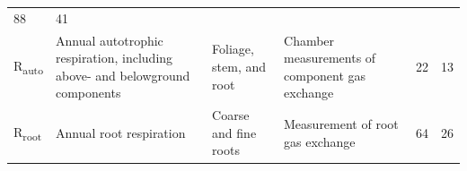 \documentclass[]{article}
\begin{document}
\begin{longtable}[]{@{}llllll@{}}
\begin{minipage}[t]{0.07\columnwidth}
88\strut
\end{minipage} & \begin{minipage}[t]{0.07\columnwidth}\raggedright\strut
41\strut
\end{minipage}\tabularnewline
\begin{minipage}[t]{0.14\columnwidth}\raggedright\strut
R\textsubscript{auto}\strut
\end{minipage} & \begin{minipage}[t]{0.19\columnwidth}\raggedright\strut
Annual autotrophic respiration, including above- and belowground
components\strut
\end{minipage} & \begin{minipage}[t]{0.13\columnwidth}\raggedright\strut
Foliage, stem, and root\strut
\end{minipage} & \begin{minipage}[t]{0.23\columnwidth}\raggedright\strut
Chamber measurements of component gas exchange\strut
\end{minipage} & \begin{minipage}[t]{0.07\columnwidth}\raggedright\strut
22\strut
\end{minipage} & \begin{minipage}[t]{0.07\columnwidth}\raggedright\strut
13\strut
\end{minipage}\tabularnewline
\begin{minipage}[t]{0.14\columnwidth}\raggedright\strut
R\textsubscript{root}\strut
\end{minipage} & \begin{minipage}[t]{0.19\columnwidth}\raggedright\strut
Annual root respiration\strut
\end{minipage} & \begin{minipage}[t]{0.13\columnwidth}\raggedright\strut
Coarse and fine roots\strut
\end{minipage} & \begin{minipage}[t]{0.23\columnwidth}\raggedright\strut
Measurement of root gas exchange\strut
\end{minipage} & \begin{minipage}[t]{0.07\columnwidth}\raggedright\strut
64\strut
\end{minipage} & \begin{minipage}[t]{0.07\columnwidth}\raggedright\strut
26\strut
\end{minipage}\tabularnewline
\bottomrule
\end{longtable}
\end{document}
